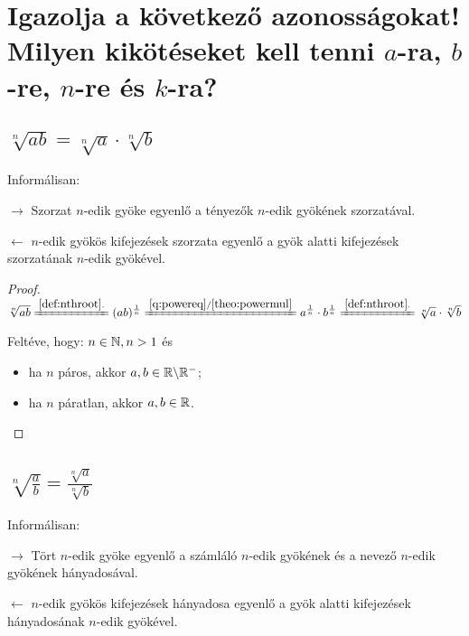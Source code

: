 
\section{Igazolja a következő azonosságokat! Milyen kikötéseket kell tenni 
  \texorpdfstring{$a$}{a}-ra, 
  \texorpdfstring{$b$}{b}-re, 
  \texorpdfstring{$n$}{n}-re és 
  \texorpdfstring{$k$}{k}-ra?}
\label{014}

\subsection{
\texorpdfstring
  {$\sqrt[n]{ab} = \sqrt[n]{a} \cdot \sqrt[n]{b}$}
  {(ab)**(1/n) = a**(1/n) * b**(1/n)}
}

Informálisan:

$\rightarrow$ Szorzat $n$-edik gyöke egyenlő a tényezők $n$-edik gyökének
szorzatával.

$\leftarrow$ $n$-edik gyökös kifejezések szorzata egyenlő a gyök alatti
kifejezések szorzatának $n$-edik gyökével.

\begin{proof}

$ \sqrt[n]{ab} 
 \xlongequal{\ref{def:nthroot}.}
  (ab)^{\frac{1}{n}}
 \xlongequal{\ref{q:powereq}/\ref{theo:powermul}}
  a^{\frac{1}{n}} \cdot b^{\frac{1}{n}} 
 \xlongequal{\ref{def:nthroot}.} 
  \sqrt[n]{a} \cdot \sqrt[n]{b}
$

Feltéve, hogy: $n \in \mathbb{N}, n >1$ és
\begin{itemize}
  \item ha $n$ páros, akkor $a, b \in \mathbb{R} \backslash \mathbb{R}^-$;
  \item ha $n$ páratlan, akkor $a, b \in \mathbb{R}$.
\end{itemize}
\end{proof}

\subsection{
\texorpdfstring
  {$\sqrt[n]{\frac{a}{b}} = \frac{\sqrt[n]{a}}{\sqrt[n]{b}}$}
  {(a/b)**n = a**n / b**n}
}

Informálisan:

$\rightarrow$ Tört $n$-edik gyöke egyenlő a számláló $n$-edik gyökének és a
nevező $n$-edik gyökének hányadosával.

$\leftarrow$ $n$-edik gyökös kifejezések hányadosa egyenlő a gyök alatti
kifejezések hányadosának $n$-edik gyökével.

